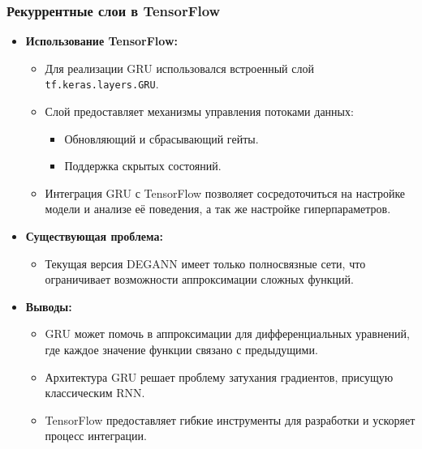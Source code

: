 \documentclass
  [ russian
  , aspectratio=1610 %
  ] {beamer}
\begin{document}
\begin{frame}
    \frametitle{Рекуррентные слои в TensorFlow}
    \begin{itemize}
        \item \textbf{Использование TensorFlow:}
        \begin{itemize}
            \item Для реализации GRU использовался встроенный слой \texttt{tf.keras.layers.GRU}.
            \item Слой предоставляет механизмы управления потоками данных:
            \begin{itemize}
                \item Обновляющий и сбрасывающий гейты.
                \item Поддержка скрытых состояний.
            \end{itemize}
            \item Интеграция GRU с TensorFlow позволяет сосредоточиться на настройке модели и анализе её поведения, а так же настройке гиперпараметров.
        \end{itemize}
        \item \textbf{Существующая проблема:}
        \begin{itemize}
            \item Текущая версия DEGANN имеет только полносвязные сети, что ограничивает возможности аппроксимации сложных функций.
        \end{itemize}
        \item \textbf{Выводы:}
        \begin{itemize}
            \item GRU может помочь в аппроксимации для дифференциальных уравнений, где каждое значение функции связано с предыдущими.
            \item Архитектура GRU решает проблему затухания градиентов, присущую классическим RNN.
            \item TensorFlow предоставляет гибкие инструменты для разработки и ускоряет процесс интеграции.
        \end{itemize}
    \end{itemize}
\end{frame}
\end{document}

